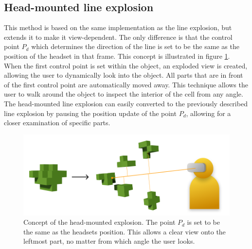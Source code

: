 \subsection{Head-mounted line explosion}
This method is based on the same implementation as the line explosion, but extends it to make it view-dependent. 
The only difference is that the control point $P_d$ which determines the direction of the line is set to be the same as the position of the headset in that frame. This concept is illustrated in figure \ref{fig:headExpl}.
When the first control point is set within the object, an exploded view is created, allowing the user to dynamically look into the object. 
All parts that are in front of the first control point are automatically moved away. 
This technique allows the user to walk around the object to inspect the interior of the cell from any angle.
The head-mounted line explosion can easily converted to the previously described line explosion by pausing the position update of the point $P_d$, allowing for a closer examination of specific parts. 
\begin{figure}[t]
	\centering
	\includegraphics[width=.65\linewidth]{fig/Images/LineExplosionHeadMounted}
	\caption[]{Concept of the head-mounted explosion. The point $P_d$ is set to be the same as the headsets position. This allows a clear view onto the leftmost part, no matter from which angle the user looks. }
	\label{fig:headExpl}
\end{figure}

